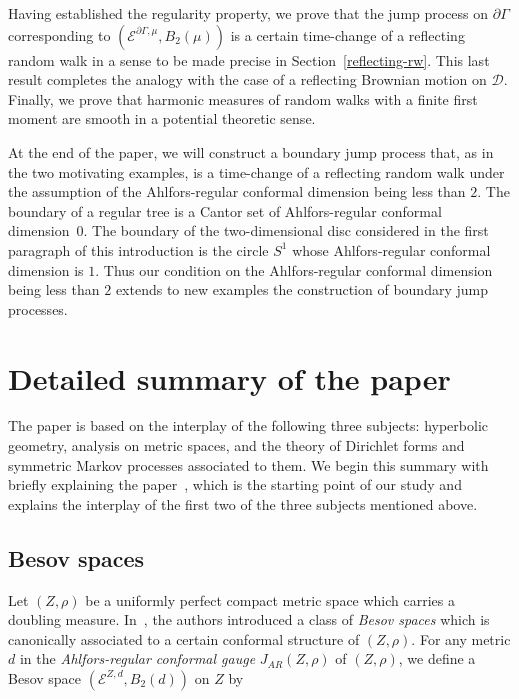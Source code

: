 \documentclass[AHL,Unicode,longabstracts,published]{cedram}
\newcommand{\ce}{\mathcal{E}}
\newcommand{\cd}{\mathcal{D}}
\begin{document}
Having established the regularity property, we prove that the jump process on $\partial\Gamma$ corresponding to $(\ce^{\partial\Gamma,\mu}, B_2(\mu))$ is a certain time-change of a reflecting random walk in a sense to be made precise in Section~\ref{reflecting-rw}. This last result completes the analogy with the case of a reflecting Brownian motion on $\cd$. Finally, we prove that harmonic measures of random walks with a finite first moment are smooth in a potential theoretic sense.

At the end of the paper, we will construct a boundary jump process that, as in the two motivating examples, is a time-change of a reflecting random walk under the assumption of the Ahlfors-regular conformal dimension being less than $2$. The boundary of a regular tree is a Cantor set of Ahlfors-regular conformal dimension~$0$. The boundary of the two-dimensional disc considered in the first paragraph of this introduction is the circle $S^1$ whose Ahlfors-regular conformal dimension is $1$. Thus our condition on the Ahlfors-regular conformal dimension being less than $2$ extends to new examples the construction of boundary jump processes.



\section{Detailed summary of the paper}\label{summary}
The paper is based on the interplay of the following three subjects: hyperbolic geometry, analysis on metric spaces, and the theory of Dirichlet forms and symmetric Markov processes associated to them. We begin this summary with briefly explaining the paper~\cite{BP}, which is the starting point of our study and explains the interplay of the first two of the three subjects mentioned above.

\subsection*{Besov spaces}
Let $(Z,\rho)$ be a uniformly perfect compact metric space which carries a doubling measure. In~\cite{BP}, the authors introduced a class of \emph{Besov spaces} which is canonically associated to a certain conformal structure of $(Z,\rho)$. For any metric $d$ in the \emph{Ahlfors-regular conformal gauge} $J_{AR}(Z,\rho)$ of $(Z,\rho)$, we define a Besov space $(\ce^{Z,d},B_2(d))$ on $Z$ by
\end{document}

